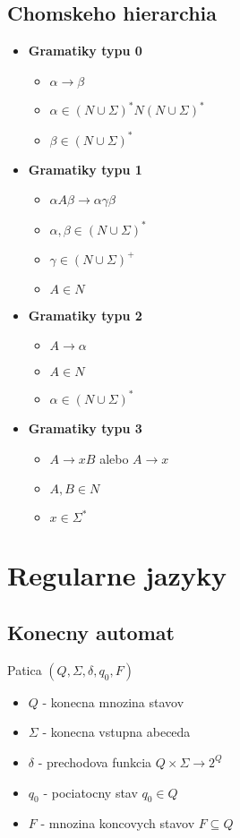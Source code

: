 \documentclass[12pt]{article}
\begin{document}
\subsection{Chomskeho hierarchia}
\begin{itemize}
	\item \textbf{Gramatiky typu 0}
		\begin{itemize}
			\item $\alpha \to \beta$
			\item $\alpha \in (N \cup \Sigma)^{*}N(N \cup \Sigma)^{*}$
			\item $\beta \in (N \cup \Sigma)^{*}$
		\end{itemize}
	\item \textbf{Gramatiky typu 1}
		\begin{itemize}
			\item $\alpha A\beta \to \alpha\gamma\beta$
			\item $\alpha,\beta \in (N \cup \Sigma)^{*}$
			\item $\gamma \in (N \cup \Sigma)^{+}$
			\item $A \in N$
		\end{itemize}
	\item \textbf{Gramatiky typu 2}
		\begin{itemize}
			\item $A \to \alpha$
			\item $A \in N$
			\item $\alpha \in (N \cup \Sigma)^{*}$
		\end{itemize}
	\item \textbf{Gramatiky typu 3}
		\begin{itemize}
			\item $A \to xB$ alebo $A \to x$
			\item $A,B \in N$
			\item $x \in \Sigma^{*}$
		\end{itemize}
\end{itemize}

\section{Regularne jazyky}
\subsection*{Konecny automat}
Patica $(Q,\Sigma,\delta,q_{0},F)$
\begin{itemize}
	\item $Q$ - konecna mnozina stavov
	\item $\Sigma$ - konecna vstupna abeceda
	\item $\delta$ - prechodova funkcia $Q \times \Sigma \to 2^{Q}$
	\item $q_{0}$ - pociatocny stav $q_{0} \in Q$
	\item $F$ - mnozina koncovych stavov $F \subseteq Q$
\end{itemize}
\end{document}
